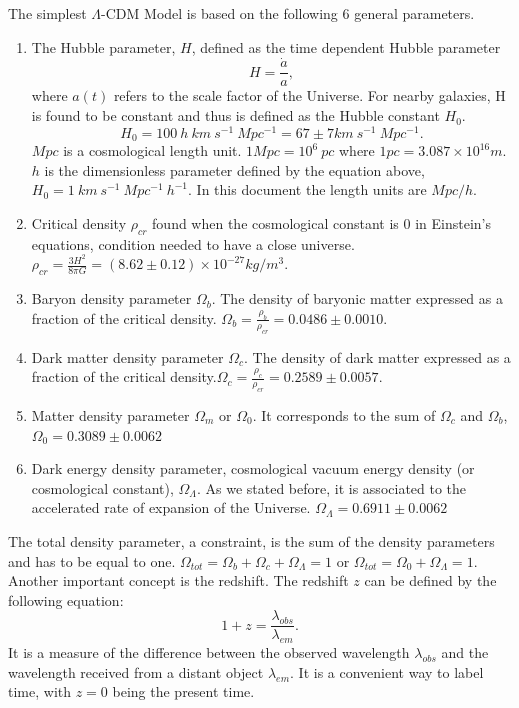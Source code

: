 \documentclass[12pt]{article}
\begin{document}
\begin{par}
The simplest $\Lambda$-CDM Model is based on the following 6 general parameters.\\
\begin{enumerate}
\item The Hubble parameter, $H$, defined as the time
 dependent Hubble parameter 
\[
H = \frac{\dot{a}}{a},
\]
where $a(t)$ refers to the scale factor of the Universe. For
 nearby galaxies, H is found to be constant and thus is
  defined as the Hubble constant $H_0$. 
\[
H_0 = 100 \ h \ km \ s^{-1} \ Mpc^{-1} = 67 \pm 7 km \  s^{-1} \ Mpc^{-1} .
\]
$Mpc$ is a cosmological length unit. $1 Mpc = 10^6 \ pc$ where $1 pc = 3.087 \times
  10^{16} m$. $h$ is the dimensionless parameter defined
   by the equation above, $H_0 = 1 \ km \ s^{-1} \ Mpc^{-1} \ h^{-1}$. In this document the length units are $Mpc/h$.

\item Critical density $\rho_{cr}$ found when the cosmological constant is 0 in Einstein's equations, condition needed to have a close universe. $\rho_{cr} = \frac{3H^2}{8 \pi G} = (8.62 \pm 0.12) \times 10^{−27} kg/m^3$. 

\item Baryon density parameter $\Omega_b$. The density of baryonic matter expressed as a fraction of the critical density. $\Omega_b = \frac{\rho_b}{\rho_{cr}} = 0.0486 \pm 0.0010$.

\item Dark matter density parameter $\Omega_c$. The density of dark matter expressed as a fraction of the critical density.$\Omega_c = \frac{\rho_c}{\rho_{cr}} = 0.2589 \pm 0.0057$.

\item Matter density parameter $\Omega_m$ or $\Omega_0$.
 It corresponds to the sum of $\Omega_c$ and
  $\Omega_b$, $\Omega_0 = 0.3089 \pm 0.0062$

\item Dark energy density parameter, cosmological vacuum energy density (or cosmological constant), $\Omega_{\Lambda}$. As we stated before, it is associated to the accelerated rate of expansion of the Universe. $\Omega_{\Lambda} = 0.6911 \pm 0.0062$



\end{enumerate}
The total density parameter, a constraint, is the sum of
 the density parameters and has to be equal to one. $\Omega_{tot} = \Omega_b + \Omega_c + \Omega_{\Lambda} =1$ or $\Omega_{tot} = \Omega_0 + \Omega_{\Lambda} =1$.\\

Another important concept is the redshift. The redshift $z$ can be defined by the following equation\cite{peebles_cosmological_2003}: 
\[
1 + z = \frac{\lambda_{obs}}{\lambda_{em}}.
\] 
It is a measure of the difference between the observed
 wavelength $\lambda_{obs}$ and the wavelength received
  from a distant object $\lambda_{em}$. It is a convenient
   way to label time, with $z=0$ being the
    present time.
\end{par}
\end{document}
